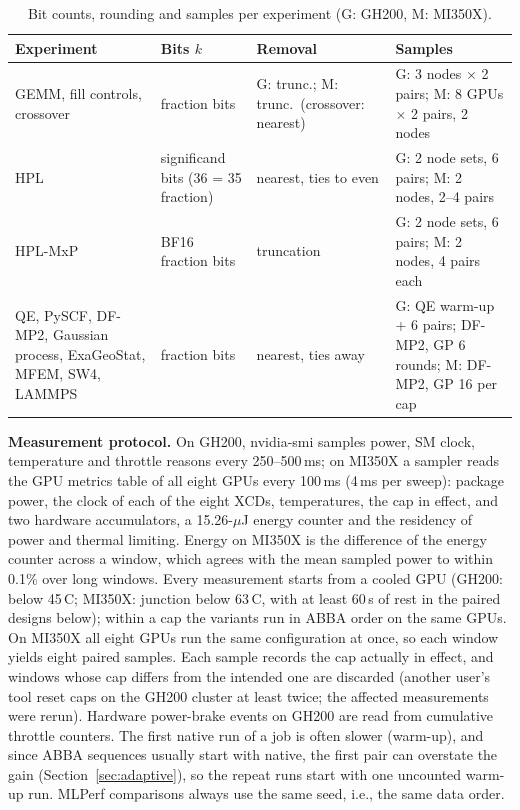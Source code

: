 \documentclass[conference]{IEEEtran}
\newcommand{\pct}{\%}
\begin{document}
\begin{table}[t]
\caption{Bit counts, rounding and samples per experiment (G: GH200, M: MI350X).}\label{tab:settings}
\centering\footnotesize\setlength{\tabcolsep}{2.5pt}
\begin{tabular}{@{}p{}p{}p{}p{}@{}}
\toprule
Experiment & Bits $k$ & Removal & Samples \\
\midrule
GEMM, fill controls, crossover & fraction bits & G: trunc.; M: trunc.\ (crossover: nearest) & G: 3 nodes $\times$ 2 pairs; M: 8 GPUs $\times$ 2 pairs, 2 nodes \\
HPL & significand bits (36 = 35 fraction) & nearest, ties to even & G: 2 node sets, 6 pairs; M: 2 nodes, 2--4 pairs \\
HPL-MxP & BF16 fraction bits & truncation & G: 2 node sets, 6 pairs; M: 2 nodes, 4 pairs each \\
QE, PySCF, DF-MP2, Gaussian process, ExaGeoStat, MFEM, SW4, LAMMPS & fraction bits & nearest, ties away & G: QE warm-up + 6 pairs; DF-MP2, GP 6 rounds; M: DF-MP2, GP 16 per cap \\
\bottomrule
\end{tabular}
\end{table}

\textbf{Measurement protocol.} On GH200, nvidia-smi samples power, SM clock, temperature and throttle reasons every
250--500\,ms; on MI350X a sampler reads the GPU metrics table of all eight GPUs every 100\,ms (4\,ms per sweep):
package power, the clock of each of the eight XCDs, temperatures, the cap in effect, and two hardware accumulators, a
15.26-$\mu$J energy counter and the residency of power and thermal limiting. Energy on MI350X is the difference of the
energy counter across a window, which agrees with the mean sampled power to within 0.1\pct{} over long windows. Every
measurement starts from a cooled GPU (GH200: below 45\,\textdegree C; MI350X: junction below 63\,\textdegree C, with at
least 60\,s of rest in the paired designs below); within a cap the variants run in ABBA order on the same GPUs. On
MI350X all eight GPUs run the same configuration at once, so each window yields eight paired samples. Each sample
records the cap actually in effect, and windows whose cap differs from the intended one are discarded (another user's
tool reset caps on the GH200 cluster at least twice; the affected measurements were rerun). Hardware power-brake
events on GH200 are read from cumulative throttle counters. The first native run of a job is often slower (warm-up),
and since ABBA sequences usually start with native, the first pair can overstate the gain (Section~\ref{sec:adaptive}),
so the repeat runs start with one uncounted warm-up run. MLPerf comparisons always use the same seed, i.e., the same
data order.
\end{document}

